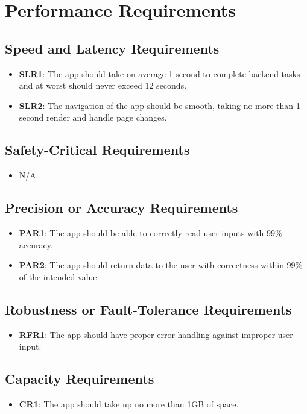 \documentclass[12pt]{article}
\begin{document}
\section{Performance Requirements}
\subsection{Speed and Latency Requirements}
\begin{itemize}
  \item \textbf{SLR1}: The app should take on average 1 second to complete backend tasks and at worst should never
  exceed 12 seconds.
  \item \textbf{SLR2}: The navigation of the app should be smooth, taking no more than 1 second render and handle page changes.
\end{itemize}
\subsection{Safety-Critical Requirements}
\begin{itemize}
  \item N/A
\end{itemize}
\subsection{Precision or Accuracy Requirements}
\begin{itemize}
  \item \textbf{PAR1}: The app should be able to correctly read user inputs with 99\% accuracy.
  \item \textbf{PAR2}: The app should return data to the user with correctness within 99\% of the intended value.
\end{itemize}
\subsection{Robustness or Fault-Tolerance Requirements}
\begin{itemize}
  \item \textbf{RFR1}: The app should have proper error-handling against improper user input.
\end{itemize}
\subsection{Capacity Requirements}
\begin{itemize}
  \item \textbf{CR1}: The app should take up no more than 1GB of space.
\end{itemize}
\end{document}
